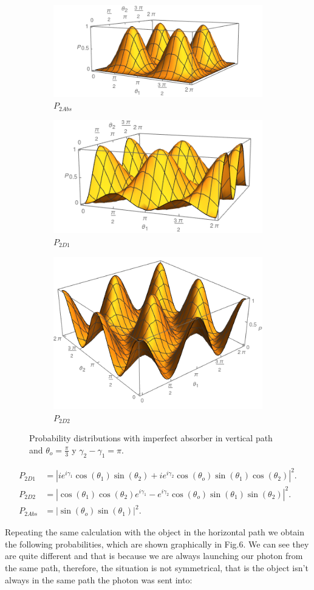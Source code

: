 \documentclass[12pt]{book}
\begin{document}
\begin{figure}[t!]
\centering
\begin{subfigure}[b]{0.45\linewidth}
\includegraphics[width=\linewidth,height=2.8 cm]{images/P1abs.png}
\caption{$P_{2Abs}$}
\label{fig:BS2}
\end{subfigure}
\begin{subfigure}[b]{0.45\linewidth}
\includegraphics[width=\linewidth,height=2.8 cm]{images/P1d1.png}
\caption{$P_{2D1}$}
\label{fig:westminster_aerea}
\end{subfigure}
\begin{subfigure}[b]{0.45\linewidth}
\includegraphics[width=\linewidth,height=2.8 cm]{images/P1d2.png}
\caption{$P_{2D2}$}
\label{fig:BS2}
\end{subfigure}
\caption{Probability distributions with imperfect absorber in vertical path and $\theta_{o}=\frac{\pi}{3}$ y $\gamma_{2}-\gamma_{1}=\pi$.}
\label{fig:westminster}
\end{figure} 


\begin{align}
 P_{2D1}&=|ie^{i\gamma_{1}}\cos(\theta_{1})\sin(\theta_{2})+i e^{i\gamma_{2}}\cos(\theta_{o}) \sin(\theta_{1})\cos(\theta_{2})|^2.\\
 P_{2D2}&=|\cos(\theta_{1})\cos(\theta_{2})e^{i\gamma_{1}}- e^{i\gamma_{2}}\cos(\theta_{o}) \sin(\theta_{1})\sin(\theta_{2})|^2.\\
 P_{2Abs}&=|\sin(\theta_{o}) \sin(\theta_{1})|^2.
\end{align}


Repeating the same calculation with the object in the horizontal path we obtain the following probabilities, which are shown graphically in Fig.6. We can see they are quite different and that is because we are always launching our photon from the same path, therefore, the situation is not symmetrical, that is the object isn't always in the same path the photon was sent into:
\end{document}
